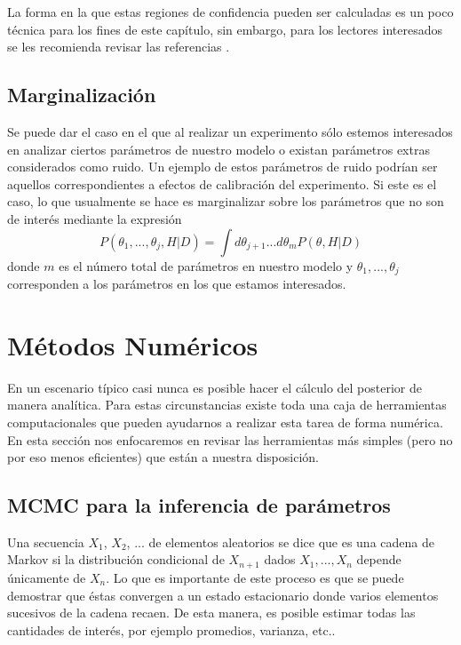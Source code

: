 \documentclass[10.5pt,prb,
               showpacs,            %
               preprintnumbers,     %
               aps,                 %
               prl,          	    %
               letterpaper,             %
               superscriptaddress,      %
               nofootinbib,         %
               tightenlines,        %
               floats,floatfix      %
               ,usenatbib]{revtex4-1}%
\begin{document}
\noindent
La forma en la que estas regiones de confidencia pueden ser calculadas es un poco t\'ecnica para los 
fines de este cap\'itulo, sin embargo, para los lectores interesados se les recomienda revisar las referencias \citep{LicV2}.

\subsection{Marginalizaci\'on}

Se puede dar el caso en el que al realizar un experimento s\'olo estemos interesados en analizar ciertos 
par\'ametros de nuestro modelo o existan par\'ametros extras considerados como ruido. Un ejemplo de 
estos par\'ametros de ruido podr\'ian ser aquellos correspondientes a efectos de calibraci\'on del experimento. 
Si este es el caso, lo que usualmente se hace es marginalizar sobre los par\'ametros que no son de inter\'es 
mediante la expresi\'on
%
	\begin{equation}
		P(\theta_1,...,\theta_j,H|D)=\int d\theta_{j+1}...d\theta_{m}P(\theta,H|D)
	\end{equation}
donde $m$ es el n\'umero total de par\'ametros en nuestro modelo y $\theta_1,...,\theta_j$ 
corresponden a los par\'ametros en los que estamos interesados.

\section{M\'etodos Num\'ericos}

En un escenario t\'ipico casi nunca es posible hacer el c\'alculo del posterior de manera anal\'itica. 
Para estas circunstancias existe toda una caja de herramientas computacionales que pueden 
ayudarnos a realizar esta tarea de forma num\'erica. En esta secci\'on nos enfocaremos en revisar 
las herramientas m\'as simples (pero no por eso menos eficientes) que est\'an a nuestra disposici\'on.

\subsection{MCMC para la inferencia de par\'ametros}

Una secuencia $X_1$, $X_2$, ... de elementos aleatorios se dice que es una cadena de Markov 
si la distribuci\'on condicional de $X_{n+1}$ dados $X_1,...,X_n$ depende \'unicamente de $X_n$. 
Lo que es importante de este proceso es que se puede demostrar que \'estas convergen a un estado 
estacionario donde varios elementos sucesivos de la cadena recaen. De esta manera, es posible estimar 
todas las cantidades de inter\'es, por ejemplo promedios, varianza, etc.. 
\end{document}
